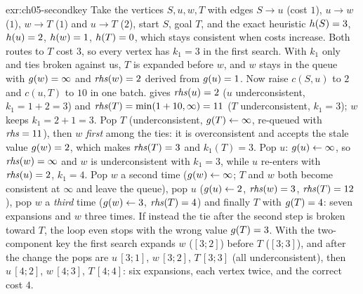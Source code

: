 \begin{solution}{exr:ch05-secondkey}
Take the vertices $S,u,w,T$ with edges $S\to u$ (cost $1$), $u\to w$ ($1$), $w\to T$ ($1$) and $u\to T$ ($2$), start $S$, goal $T$, and the exact heuristic $h(S)=3$, $h(u)=2$, $h(w)=1$, $h(T)=0$, which stays consistent when costs increase. Both routes to $T$ cost $3$, so every vertex has $k_1=3$ in the first search. With $k_1$ only and ties broken against us, $T$ is expanded before $w$, and $w$ stays in the queue with $g(w)=\infty$ and $\mathit{rhs}(w)=2$ derived from $g(u)=1$. Now raise $c(S,u)$ to $2$ and $c(u,T)$ to $10$ in one batch. \LpaUpdateVertex gives $\mathit{rhs}(u)=2$ ($u$ underconsistent, $k_1=1+2=3$) and $\mathit{rhs}(T)=\min(1+10,\infty)=11$ ($T$ underconsistent, $k_1=3$); $w$ keeps $k_1=2+1=3$. Pop $T$ (underconsistent, $g(T)\gets\infty$, re-queued with $\mathit{rhs}=11$), then $w$ \emph{first} among the ties: it is overconsistent and accepts the stale value $g(w)=2$, which makes $\mathit{rhs}(T)=3$ and $k_1(T)=3$. Pop $u$: $g(u)\gets\infty$, so $\mathit{rhs}(w)=\infty$ and $w$ is underconsistent with $k_1=3$, while $u$ re-enters with $\mathit{rhs}(u)=2$, $k_1=4$. Pop $w$ a second time ($g(w)\gets\infty$; $T$ and $w$ both become consistent at $\infty$ and leave the queue), pop $u$ ($g(u)\gets 2$, $\mathit{rhs}(w)=3$, $\mathit{rhs}(T)=12$), pop $w$ a \emph{third} time ($g(w)\gets 3$, $\mathit{rhs}(T)=4$) and finally $T$ with $g(T)=4$: seven expansions and $w$ three times. If instead the tie after the second step is broken toward $T$, the loop even stops with the wrong value $g(T)=3$. With the two-component key the first search expands $w$ ($[3;2]$) before $T$ ($[3;3]$), and after the change the pops are $u\,[3;1]$, $w\,[3;2]$, $T\,[3;3]$ (all underconsistent), then $u\,[4;2]$, $w\,[4;3]$, $T\,[4;4]$: six expansions, each vertex twice, and the correct cost $4$.
\end{solution}

